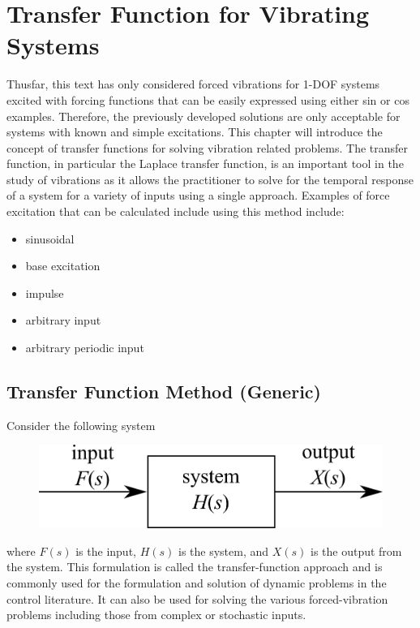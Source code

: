 \documentclass[12pt,letter]{article}
\numberwithin{ex}{section} %
\numberwithin{re}{section} %
\begin{document}
	\large{}
	
	\setcounter{section}{3}
	\section{Transfer Function for Vibrating Systems}

		Thusfar, this text has only considered forced vibrations for 1-DOF systems excited with forcing functions that can be easily expressed using either sin or cos examples. Therefore, the previously developed solutions are only acceptable for systems with known and simple excitations. This chapter will introduce the concept of transfer functions for solving vibration related problems. The transfer function, in particular the Laplace transfer function, is an important tool in the study of vibrations as it allows the practitioner to solve for the temporal response of a system for a variety of inputs using a single approach. Examples of force excitation that can be calculated include using this method include:
		\begin{itemize}
			\item sinusoidal
			\item base excitation
			\item impulse
			\item arbitrary input
			\item arbitrary periodic input
		\end{itemize}

		\subsection{Transfer Function Method (Generic)}

			Consider the following system
			\begin{figure}[H]
				\centering
				\includegraphics[]{../figures/transfer_function_system.png}
			\end{figure}
			\noindent where $F(s)$ is the input, $H(s)$ is the system, and $X(s)$ is the output from the system. This formulation is called the transfer-function approach and is commonly used for the formulation and solution of dynamic problems in the control literature. It can also be used for solving the various forced-vibration problems including those from complex or stochastic inputs. 
\end{document}
